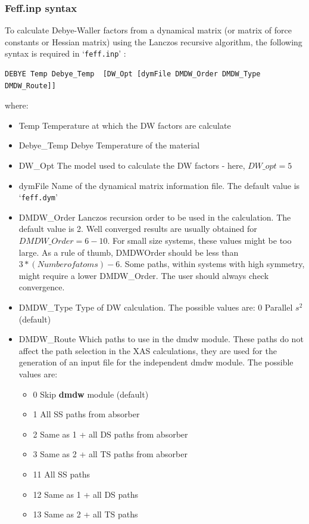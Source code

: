 \documentclass[11pt,oneside]{report} %
\newcommand{\file}[1]{`\texttt{#1}'}
\newcommand{\module}[1]{\textrm{\bf{#1}}}
\begin{document}
\subsubsection{Feff.inp syntax}
To calculate Debye-Waller factors from a dynamical matrix (or matrix of force constants or Hessian matrix) using the Lanczos recursive algorithm, the following syntax is required in \file{feff.inp} :
\begin{verbatim}
DEBYE Temp Debye_Temp  [DW_Opt [dymFile DMDW_Order DMDW_Type DMDW_Route]]
\end{verbatim}
where:
\begin{itemize}
\tightlist
	\item Temp		Temperature at which the DW factors are calculate
	\item Debye\_Temp	Debye Temperature of the material
	\item DW\_Opt		The model used to calculate the DW factors - here, $DW\_opt=5$
	\item dymFile		Name of the dynamical matrix information file. The
			default value is \file{feff.dym}
	\item DMDW\_Order	Lanczos recursion order to be used in the calculation.
			The default value is 2. Well converged results are
			usually obtained for $DMDW\_Order=6-10$. For small size
			systems, these values might be too large. As a rule
			of thumb, DMDWOrder should be less than
			$3*(Number of atoms)-6$. Some paths, within systems with
			high symmetry, might require a lower DMDW\_Order. The
			user should always check convergence.
	\item DMDW\_Type	Type of DW calculation.
			The possible values are:
				0	Parallel $s^2$  (default)
	\item DMDW\_Route	Which paths to use in the dmdw module. These paths do
			not affect the path selection in the XAS calculations,
			they are used for the generation of an input file for
			the independent dmdw module.
			The possible values are:
			\begin{itemize}
			\tightlist
			\item	 0	Skip \module{dmdw} module  (default)
			\item	 1	All SS paths from absorber
			\item	 2	Same as 1 + all DS paths from absorber
			\item	 3	Same as 2 + all TS paths from absorber
			\item	11	All SS paths
			\item	12	Same as 1 + all DS paths
			\item	13	Same as 2 + all TS paths
				\end{itemize}
\end{itemize}
\end{document}
